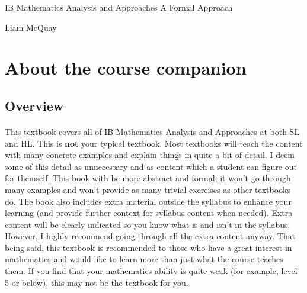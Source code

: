 \documentclass[12pt, a4paper, titlepage, twoside]{article}
\begin{document}
	\begin{titlepage}
  	\null\vfill

  	\begin{center}
  		{\Huge IB Mathematics Analysis and Approaches} \vskip 2cm
  		{\Large A Formal Approach} \vskip 1cm
 	\end{center}

	\vfill
	\vfill
	
	\begin{center}
  		{\Large Liam McQuay}
 	\end{center}

	\end{titlepage}

	\newpage
	
	\tableofcontents
	
	\newpage
	
\section{About the course companion}

	\subsection*{Overview}

	\paragraph{}
	This textbook covers all of IB Mathematics Analysis and Approaches at both SL and HL. This 
	is \textbf{not} your typical textbook. Most textbooks will teach the content with many concrete examples and explain
	things in quite a bit of detail. I deem some of this detail as unnecessary and as content which a student can figure out
	for themself. This book with be more abstract and formal; it won't go through many examples and won't provide as many
	trivial exercises as other textbooks do. 
	The book also includes extra material outside the syllabus to enhance your learning (and provide further context for 	
	syllabus content when needed). Extra content will be clearly indicated so you know what is and isn't in the syllabus. However, I highly 
	recommend going through all the extra content anyway. That being said, this textbook is recommended to those who have a great
	interest in mathematics and would like to learn more than just what the course teaches them. If you find that your mathematics 
	ability is quite weak (for example, level 5 or below), this may not be the textbook for you.
\end{document}
